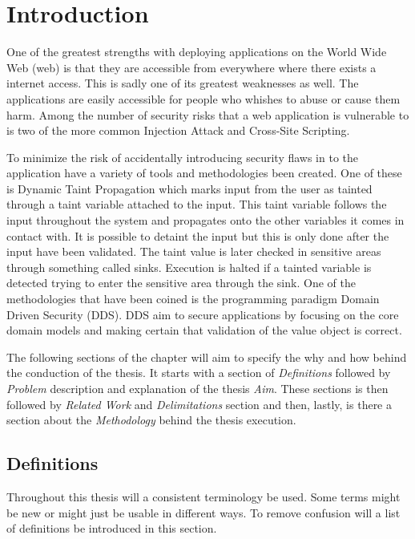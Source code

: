 \chapter{Introduction}
One of the greatest strengths with deploying applications on the World Wide Web (web) is that they are accessible from everywhere where there exists a internet access. This is sadly one of its greatest weaknesses as well. The applications are easily accessible for people who whishes to abuse or cause them harm. Among the number of security risks that a web application is vulnerable to is two of the more common Injection Attack and Cross-Site Scripting. \parencite{OpenWebApplicationSecurityProject, CrossMichael2007Dgtw}

To minimize the risk of accidentally introducing security flaws in to the application have a variety of tools and methodologies been created. One of these is Dynamic Taint Propagation which marks input from the user as tainted through a taint variable attached to the input. This taint variable follows the input throughout the system and propagates onto the other variables it comes in contact with. It is possible to detaint the input but this is only done after the input have been validated. The taint value is later checked in sensitive areas through something called sinks. Execution is halted if a tainted variable is detected trying to enter the sensitive area through the sink. \parencite{Pan2015, Venkataramani2008} One of the methodologies that have been coined is the programming paradigm Domain Driven Security (DDS). DDS aim to secure applications by focusing on the core domain models and making certain that validation of the value object is correct. \parencite{Wilander2009, Johnsson2009}

The following sections of the chapter will aim to specify the why and how behind the conduction of the thesis. It starts with a section of \textit{Definitions} followed by \textit{Problem} description and explanation of the thesis \textit{Aim}. These sections is then followed by \textit{Related Work} and \textit{Delimitations} section and then, lastly, is there a section about the \textit{Methodology} behind the thesis execution.


\section{Definitions}
Throughout this thesis will a consistent terminology be used. Some terms might be new or might just be usable in different ways. To remove confusion will a list of definitions be introduced in this section.

